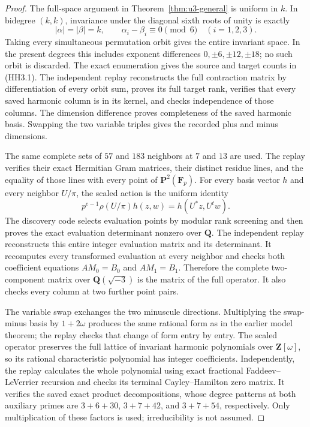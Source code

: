 \begin{proof}
The full-space argument in Theorem~\ref{thm:u3-general} is
uniform in \(k\). In bidegree \((k,k)\), invariance under the
diagonal sixth roots of unity is exactly
\[
 |\alpha|=|\beta|=k,\qquad
 \alpha_i-\beta_i\equiv0\pmod6\quad(i=1,2,3).
 \tag{HH3.5}
\]
Taking every simultaneous permutation orbit gives the entire
invariant space. In the present degrees this includes exponent
differences \(0,\pm6,\pm12,\pm18\); no such orbit is discarded.
The exact enumeration gives the source and target counts in
(HH3.1). The independent replay reconstructs the full contraction
matrix by differentiation of every orbit sum, proves its full
target rank, verifies that every saved harmonic column is in
its kernel, and checks independence of those columns. The
dimension difference proves completeness of the saved harmonic
basis. Swapping the two variable triples gives the recorded
plus and minus dimensions.

The same complete sets of \(57\) and \(183\) neighbors at \(7\)
and \(13\) are used. The replay verifies their exact Hermitian
Gram matrices, their distinct residue lines, and the equality
of those lines with every point of \(\mathbf P^2(\mathbf F_p)\).
For every basis vector \(h\) and every neighbor \(U/\pi\),
the scaled action is the uniform identity
\[
 p^{e-1}\rho(U/\pi)h(z,w)=h(U^*z,U^tw).
 \tag{HH3.6}
\]
The discovery code selects evaluation points by modular rank
screening and then proves the exact evaluation determinant
nonzero over \(\mathbf Q\). The independent replay reconstructs
this entire integer evaluation matrix and its determinant.
It recomputes every transformed evaluation at every neighbor
and checks both coefficient equations \(AM_0=B_0\) and
\(AM_1=B_1\). Therefore the complete two-component matrix over
\(\mathbf Q(\sqrt{-3})\) is the matrix of the full operator.
It also checks every column at two further point pairs.

The variable swap exchanges the two minuscule directions.
Multiplying the swap-minus basis by \(1+2\omega\) produces
the same rational form as in the earlier model theorem; the
replay checks that change of form entry by entry. The scaled
operator preserves the full lattice of invariant harmonic
polynomials over \(\mathbf Z[\omega]\), so its rational
characteristic polynomial has integer coefficients.
Independently, the replay calculates the whole polynomial
using exact fractional Faddeev--LeVerrier recursion and
checks its terminal Cayley--Hamilton zero matrix. It verifies
the saved exact product decompositions, whose degree patterns
at both auxiliary primes are \(3+6+30\), \(3+7+42\), and
\(3+7+54\), respectively. Only multiplication of these factors
is used; irreducibility is not assumed.


\end{proof}
